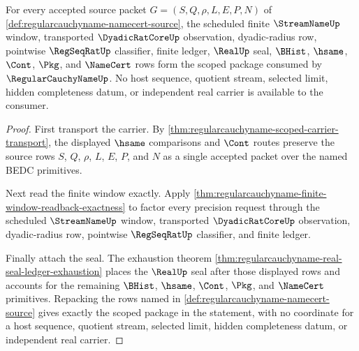 \begin{theorem}
\label{thm:regularcauchyname-window-radius-seal-scoped-package}
For every accepted source packet $G=(S,Q,\rho,L,E,P,N)$ of \autoref{def:regularcauchyname-namecert-source}, the scheduled finite $\StreamNameUp$ window, transported $\DyadicRatCoreUp$ observation, dyadic-radius row, pointwise $\RegSeqRatUp$ classifier, finite ledger, $\RealUp$ seal, $\BHist$, $\hsame$, $\Cont$, $\Pkg$, and $\NameCert$ rows form the scoped package consumed by $\RegularCauchyNameUp$. No host sequence, quotient stream, selected limit, hidden completeness datum, or independent real carrier is available to the consumer.
\end{theorem}
\begin{proof}
First transport the carrier. By \autoref{thm:regularcauchyname-scoped-carrier-transport}, the displayed $\hsame$ comparisons and $\Cont$ routes preserve the source rows $S$, $Q$, $\rho$, $L$, $E$, $P$, and $N$ as a single accepted packet over the named BEDC primitives.

Next read the finite window exactly. Apply \autoref{thm:regularcauchyname-finite-window-readback-exactness} to factor every precision request through the scheduled $\StreamNameUp$ window, transported $\DyadicRatCoreUp$ observation, dyadic-radius row, pointwise $\RegSeqRatUp$ classifier, and finite ledger.

Finally attach the seal. The exhaustion theorem \autoref{thm:regularcauchyname-real-seal-ledger-exhaustion} places the $\RealUp$ seal after those displayed rows and accounts for the remaining $\BHist$, $\hsame$, $\Cont$, $\Pkg$, and $\NameCert$ primitives. Repacking the rows named in \autoref{def:regularcauchyname-namecert-source} gives exactly the scoped package in the statement, with no coordinate for a host sequence, quotient stream, selected limit, hidden completeness datum, or independent real carrier.
\end{proof}

